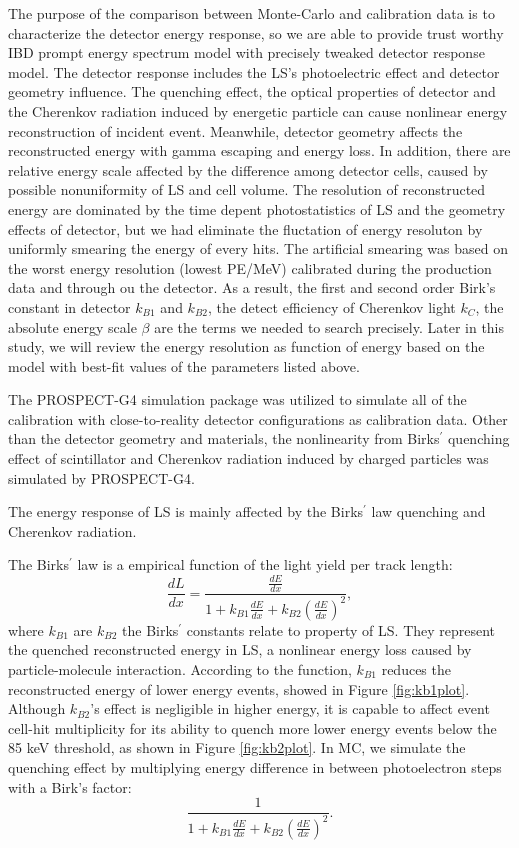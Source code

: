 The purpose of the comparison between Monte-Carlo and calibration data is to characterize the detector energy response, so we are able to provide trust worthy IBD prompt energy spectrum model with precisely tweaked detector response model.
The detector response includes the LS's photoelectric effect and detector geometry influence. 
The quenching effect, the optical properties of detector and the Cherenkov radiation induced by energetic particle can cause nonlinear energy reconstruction of incident event.
Meanwhile, detector geometry affects the reconstructed energy with gamma escaping and energy loss.
In addition, there are relative energy scale affected by the difference among detector cells, caused by possible nonuniformity of LS and cell volume.
The resolution of reconstructed energy are dominated by the time depent photostatistics of LS and the geometry effects of detector, but we had eliminate the fluctation of energy resoluton by uniformly smearing the energy of every hits.
The artificial smearing was based on the worst energy resolution (lowest PE/MeV) calibrated during the production data and through ou the detector.
As a result, the first and second order Birk’s constant in detector $k_{B1}$ and $k_{B2}$, the detect efficiency of Cherenkov light $k_{C}$, the absolute energy scale $\beta$ are the terms we needed to search precisely. 
Later in this study, we will review the energy resolution as function of energy based on the model with best-fit values of the parameters listed above.

The PROSPECT-G4 simulation package was utilized to simulate all of the calibration with close-to-reality detector configurations as calibration data.
Other than the detector geometry and materials, the nonlinearity from Birks$^\prime$ quenching effect of scintillator and Cherenkov radiation induced by charged particles was simulated by PROSPECT-G4.

\label{sec:nonlinear}
The energy response of LS is mainly affected by the Birks$^\prime$ law quenching and Cherenkov radiation. 

The Birks$^\prime$ law is a empirical function of the light yield per track length:
\begin{equation}
    \frac{dL}{dx} = \frac{\frac{dE}{dx}}{1+k_{B1}\frac{dE}{dx}+k_{B2}(\frac{dE}{dx})^2},
\end{equation}
where $k_{B1}$ are $k_{B2}$ the Birks$^\prime$ constants relate to property of LS. 
They represent the quenched reconstructed energy in LS, a nonlinear energy loss caused by particle-molecule interaction. 
According to the function, $k_{B1}$ reduces the reconstructed energy of lower energy events, showed in Figure \ref{fig:kb1plot}.
Although $k_{B2}$'s effect is negligible in higher energy, it is capable to affect event cell-hit multiplicity for its ability to quench more lower energy events below the 85 keV threshold, as shown in Figure \ref{fig:kb2plot}.
In MC, we  simulate the quenching effect by multiplying energy difference in between photoelectron steps with a Birk's factor:
\begin{equation}
   \frac{1}{1+k_{B1}\frac{dE}{dx}+k_{B2}(\frac{dE}{dx})^2}.
   \label{eql:birks}
\end{equation}

